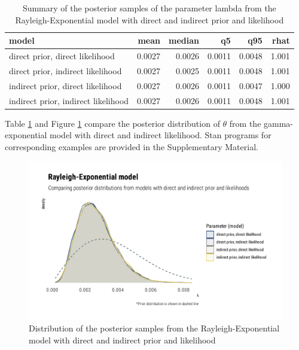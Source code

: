 \documentclass[
  12pt,
]{article}
\begin{document}
\begin{table}[!h]

\caption{\label{tab:rexp-prior-lik-tab}Summary of the posterior samples of the parameter lambda from the Rayleigh-Exponential model with direct and indirect prior and likelihood}
\centering
\begin{tabular}[t]{lrrrrr}
\toprule
model & mean & median & q5 & q95 & rhat\\
\midrule
direct prior, direct likelihood & 0.0027 & 0.0026 & 0.0011 & 0.0048 & 1.001\\
direct prior, indirect likelihood & 0.0027 & 0.0025 & 0.0011 & 0.0048 & 1.001\\
indirect prior, direct likelihood & 0.0027 & 0.0026 & 0.0011 & 0.0047 & 1.000\\
indirect prior, indirect likelihood & 0.0027 & 0.0026 & 0.0011 & 0.0048 & 1.001\\
\bottomrule
\end{tabular}
\end{table}

Table \ref{tab:rexp-prior-lik-tab} and Figure \ref{fig:rexp-prior-lik-graphs} compare the posterior distribution of \(\theta\) from the gamma-exponential model with direct and indirect likelihood. Stan programs for corresponding examples are provided in the Supplementary Material.

\begin{figure}

{\centering \includegraphics[width=0.8\linewidth]{ilbm_article_files/figure-latex/rexp-prior-lik-graphs-1} 

}

\caption{Distribution of the posterior samples from the Rayleigh-Exponential model with direct and indirect prior and likelihood}\label{fig:rexp-prior-lik-graphs}
\end{figure}
\end{document}
